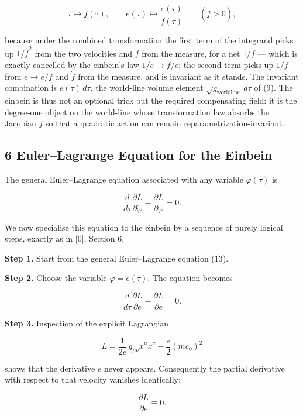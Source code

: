 \documentclass[
]{article}
\begin{document}
\[\tau \longmapsto f(\tau), \qquad e(\tau) \longmapsto \frac{e(\tau)}{\dot{f}(\tau)} \qquad (\dot{f} > 0), \tag{12}\]

because under the combined transformation the first term of the
integrand picks up \(1/\dot{f}^{2}\) from the two velocities and
\(\dot{f}\) from the measure, for a net \(1/\dot{f}\) --- which is
exactly cancelled by the einbein's law \(1/e \to \dot{f}/e\); the second
term picks up \(1/\dot{f}\) from \(e \to e/\dot{f}\) and \(\dot{f}\)
from the measure, and is invariant as it stands. The invariant
combination is \(e(\tau)\, d\tau\), the world-line volume element
\(\sqrt{g_{\mathrm{worldline}}}\, d\tau\) of (9). The einbein is thus
not an optional trick but the required compensating field: it is the
degree-one object on the world-line whose transformation law absorbs the
Jacobian \(\dot{f}\) so that a quadratic action can remain
reparametrization-invariant.

\hypertarget{eulerlagrange-equation-for-the-einbein}{%
\subsection{6 Euler--Lagrange Equation for the
Einbein}\label{eulerlagrange-equation-for-the-einbein}}

The general Euler--Lagrange equation associated with any variable
\(\varphi(\tau)\) is

\[\frac{d}{d\tau} \frac{\partial L}{\partial \dot{\varphi}} - \frac{\partial L}{\partial \varphi} = 0. \tag{13}\]

We now specialise this equation to the einbein by a sequence of purely
logical steps, exactly as in {[}0{]}, Section 6.

\textbf{Step 1.} Start from the general Euler--Lagrange equation (13).

\textbf{Step 2.} Choose the variable \(\varphi = e(\tau)\). The equation
becomes

\[\frac{d}{d\tau} \frac{\partial L}{\partial \dot{e}} - \frac{\partial L}{\partial e} = 0. \tag{14}\]

\textbf{Step 3.} Inspection of the explicit Lagrangian

\[L = \frac{1}{2e}\, g_{\mu\nu} \dot{x}^{\mu} \dot{x}^{\nu} - \frac{e}{2}(mc_{0})^{2} \tag{15}\]

shows that the derivative \(\dot{e}\) never appears. Consequently the
partial derivative with respect to that velocity vanishes identically:

\[\frac{\partial L}{\partial \dot{e}} \equiv 0. \tag{16}\]
\end{document}
